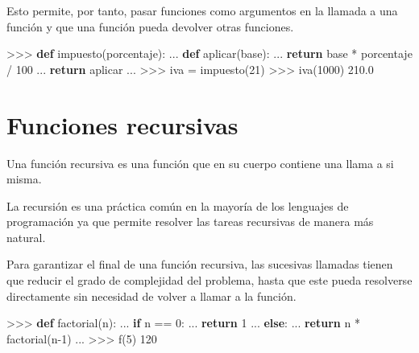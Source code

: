 \documentclass[
  spanish,
  a4paper,
]{scrreport}
\newenvironment{Shaded}{\begin{snugshade}}{\end{snugshade}}
\newcommand{\ControlFlowTok}[1]{\textcolor[rgb]{0.00,0.23,0.31}{\textbf{#1}}}
\newcommand{\DecValTok}[1]{\textcolor[rgb]{0.68,0.00,0.00}{#1}}
\newcommand{\FloatTok}[1]{\textcolor[rgb]{0.68,0.00,0.00}{#1}}
\newcommand{\KeywordTok}[1]{\textcolor[rgb]{0.00,0.23,0.31}{\textbf{#1}}}
\newcommand{\NormalTok}[1]{\textcolor[rgb]{0.00,0.23,0.31}{#1}}
\newcommand{\OperatorTok}[1]{\textcolor[rgb]{0.37,0.37,0.37}{#1}}
\begin{document}
Esto permite, por tanto, pasar funciones como argumentos en la llamada a
una función y que una función pueda devolver otras funciones.

\begin{Shaded}
\begin{Highlighting}[]
\OperatorTok{\textgreater{}\textgreater{}\textgreater{}} \KeywordTok{def}\NormalTok{ impuesto(porcentaje):}
\NormalTok{...     }\KeywordTok{def}\NormalTok{ aplicar(base):}
\NormalTok{...             }\ControlFlowTok{return}\NormalTok{ base }\OperatorTok{*}\NormalTok{ porcentaje }\OperatorTok{/} \DecValTok{100}
\NormalTok{...     }\ControlFlowTok{return}\NormalTok{ aplicar}
\NormalTok{... }
\OperatorTok{\textgreater{}\textgreater{}\textgreater{}}\NormalTok{ iva }\OperatorTok{=}\NormalTok{ impuesto(}\DecValTok{21}\NormalTok{)}
\OperatorTok{\textgreater{}\textgreater{}\textgreater{}}\NormalTok{ iva(}\DecValTok{1000}\NormalTok{)}
\FloatTok{210.0}
\end{Highlighting}
\end{Shaded}

\section{Funciones recursivas}\label{funciones-recursivas}

Una función recursiva es una función que en su cuerpo contiene una llama
a si misma.

La recursión es una práctica común en la mayoría de los lenguajes de
programación ya que permite resolver las tareas recursivas de manera más
natural.

Para garantizar el final de una función recursiva, las sucesivas
llamadas tienen que reducir el grado de complejidad del problema, hasta
que este pueda resolverse directamente sin necesidad de volver a llamar
a la función.

\begin{Shaded}
\begin{Highlighting}[]
\OperatorTok{\textgreater{}\textgreater{}\textgreater{}} \KeywordTok{def}\NormalTok{ factorial(n):}
\NormalTok{...     }\ControlFlowTok{if}\NormalTok{ n }\OperatorTok{==} \DecValTok{0}\NormalTok{:}
\NormalTok{...         }\ControlFlowTok{return} \DecValTok{1}
\NormalTok{...     }\ControlFlowTok{else}\NormalTok{:}
\NormalTok{...         }\ControlFlowTok{return}\NormalTok{ n }\OperatorTok{*}\NormalTok{ factorial(n}\OperatorTok{{-}}\DecValTok{1}\NormalTok{)}
\NormalTok{...}
\OperatorTok{\textgreater{}\textgreater{}\textgreater{}}\NormalTok{ f(}\DecValTok{5}\NormalTok{)}
\DecValTok{120}
\end{Highlighting}
\end{Shaded}
\end{document}
